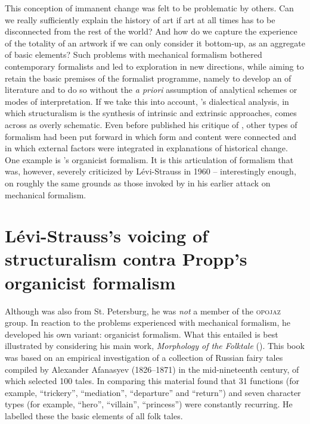 \documentclass[output=paper]{langscibook}
\begin{document}
This conception of immanent change was felt to be problematic by others. Can we really sufficiently explain the history of art if art at all times has to be disconnected from the rest of the world? And how do we capture the experience of the totality of an artwork if we can only consider it bottom-up, as an aggregate of basic elements? Such problems with mechanical formalism bothered contemporary formalists and led to exploration in new directions, while aiming to retain the basic premises of the formalist programme, namely to develop an  of literature and to do so without the \emph{a priori} assumption of analytical schemes or modes of interpretation. If we take this into account, {\Mukarovsky}'s dialectical analysis, in which structuralism is the synthesis of intrinsic and extrinsic approaches, comes across as overly schematic. Even before {\Mukarovsky} published his critique of {\Shklovsky}, other types of formalism had been put forward in which form and content were connected and in which external factors were integrated in explanations of historical change. One example is {\Propp}'s organicist formalism. It is this articulation of formalism that was, however, severely criticized by Lévi-Strauss in 1960 -- interestingly enough, on roughly the same grounds as those invoked by {\Mukarovsky} in his earlier attack on mechanical formalism. 

\section{Lévi-Strauss's voicing of structuralism contra Propp's organicist formalism}
\label{sec:karstens:levi-strauss}

Although {\Propp} was also from St. Petersburg, he was \emph{not} a member of the \textsc{opojaz} group. In reaction to the problems experienced with mechanical formalism, he developed his own variant: organicist formalism. What this entailed is best illustrated by considering his main work, \emph{Morphology of the Folktale} (\citeyear{Propp1928}). This book was based on an empirical investigation of a collection of Russian fairy tales compiled by Alexander Afanasyev (1826--1871) in the mid-nineteenth century, of which {\Propp} selected 100 tales. In comparing this material {\Propp} found that 31 functions (for example, ``trickery'', ``mediation'', ``departure'' and ``return'') and seven character types (for example, ``hero'', ``villain'', ``princess'') were constantly recurring. He labelled these  the basic elements of all folk tales. 
\end{document}
